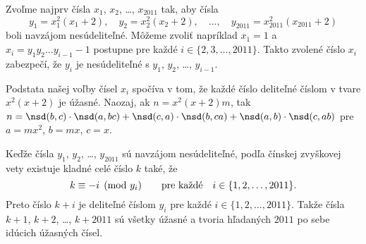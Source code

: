 {%
Zvoľme najprv čísla $x_1$, $x_2$, \dots, $x_{2011}$ tak, aby čísla
$$
y_1=x_1^2(x_1+2),\quad y_2=x_2^2(x_2+2),\quad\dots,\quad y_{2011}=x_{2011}^2(x_{2011}+2)
$$
boli navzájom nesúdeliteľné. Môžeme zvoliť napríklad $x_1 =1$ a $x_i = {y_1y_2\dots y_{i-1}-1}$ postupne pre každé $i\in\{2,3,\dots,2011\}$.
Takto zvolené číslo $x_i$ zabezpečí, že $y_i$ je nesúdeliteľné s $y_1$, $y_2$, \dots, $y_{i-1}$.

Podstata našej voľby čísel $x_i$ spočíva v tom, že každé číslo deliteľné číslom v tvare $x^2(x+2)$ je úžasné.
Naozaj, ak $n = x^2(x+2)m$, tak $n=\nsd(b,c)\cdot\nsd(a,bc)+\nsd(c,a)\cdot\nsd(b, ca)+\nsd(a,b)\cdot\nsd(c,ab)$  pre $a = mx^2$, $b = mx$, $c = x$.

Keďže čísla $y_1$, $y_2$, \dots, $y_{2011}$ sú navzájom nesúdeliteľné, podľa čínskej zvyškovej vety existuje kladné celé číslo $k$ také, že
$$
k\equiv -i\pmod {y_i}\qquad \hbox{pre každé}\quad i\in\{1,2,\dots,2011\}.
$$
Preto číslo $k+i$ je deliteľné číslom $y_i$ pre každé $i\in\{1,2,\dots,2011\}$.
Takže čísla $k+1$, $k+2$, \dots, $k+2011$ sú všetky úžasné a tvoria hľadaných $2011$ po sebe idúcich úžasných čísel.
}

